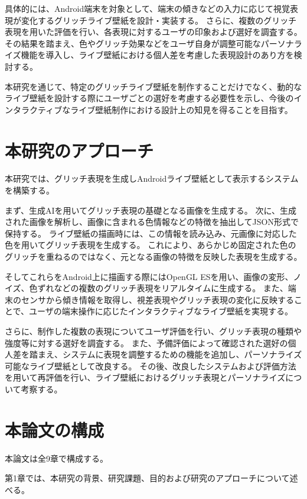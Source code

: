 具体的には、Android端末を対象として、端末の傾きなどの入力に応じて視覚表現が変化するグリッチライブ壁紙を設計・実装する。
さらに、複数のグリッチ表現を用いた評価を行い、各表現に対するユーザの印象および選好を調査する。
その結果を踏まえ、色やグリッチ効果などをユーザ自身が調整可能なパーソナライズ機能を導入し、ライブ壁紙における個人差を考慮した表現設計のあり方を検討する。

本研究を通じて、特定のグリッチライブ壁紙を制作することだけでなく、動的なライブ壁紙を設計する際にユーザごとの選好を考慮する必要性を示し、今後のインタラクティブなライブ壁紙制作における設計上の知見を得ることを目指す。

\section{本研究のアプローチ}

本研究では、グリッチ表現を生成しAndroidライブ壁紙として表示するシステムを構築する。

まず、生成AIを用いてグリッチ表現の基礎となる画像を生成する。
次に、生成された画像を解析し、画像に含まれる色情報などの特徴を抽出してJSON形式で保持する。
ライブ壁紙の描画時には、この情報を読み込み、元画像に対応した色を用いてグリッチ表現を生成する。
これにより、あらかじめ固定された色のグリッチを重ねるのではなく、元となる画像の特徴を反映した表現を生成する。

そしてこれらをAndroid上に描画する際にはOpenGL ESを用い、画像の変形、ノイズ、色ずれなどの複数のグリッチ表現をリアルタイムに生成する。
また、端末のセンサから傾き情報を取得し、視差表現やグリッチ表現の変化に反映することで、ユーザの端末操作に応じたインタラクティブなライブ壁紙を実現する。

さらに、制作した複数の表現についてユーザ評価を行い、グリッチ表現の種類や強度等に対する選好を調査する。
また、予備評価によって確認された選好の個人差を踏まえ、システムに表現を調整するための機能を追加し、パーソナライズ可能なライブ壁紙として改良する。
その後、改良したシステムおよび評価方法を用いて再評価を行い、ライブ壁紙におけるグリッチ表現とパーソナライズについて考察する。


\section{本論文の構成}

本論文は全9章で構成する。


第1章では、本研究の背景、研究課題、目的および研究のアプローチについて述べる。


